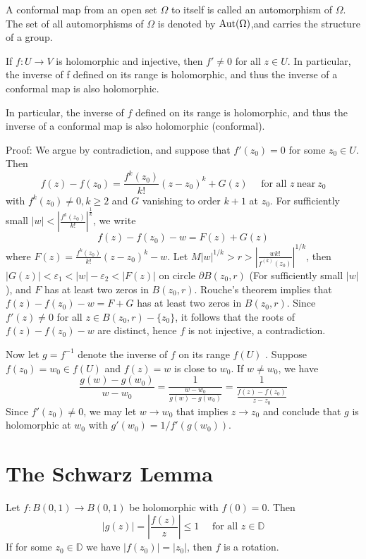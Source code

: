 \documentclass[12pt, oneside]{book}
\begin{document}
\begin{definition}
    A conformal map from an open set $\Omega$ to itself is called an automorphism of $\Omega$.
    The set of all automorphisms of $\Omega$ is denoted by $\operatorname{\operatorname{Aut}}(\Omega)$,and carries the structure of a group.
\end{definition}
\begin{theorem}
    If $f:U\longrightarrow V$ is holomorphic and injective, then $f'\neq0$ for all $z\in U$. In particular, the inverse of f defined on its range is holomorphic, and thus the inverse of a conformal map is also holomorphic.

    In particular, the inverse of $f$ deﬁned on its range is holomorphic, and thus the inverse of a conformal map is also holomorphic (conformal).

    Proof: We argue by contradiction, and suppose that $f'(z_0)= 0$ for some $z_0\in U$. Then
    $$f(z)-f(z_0)=\frac{f^{k}(z_0)}{k!}(z-z_0)^k+G(z)\quad\text{ for all }z\mathrm{~near~}z_0$$
    with $f^{k}(z_0)\neq 0, k\geq2$ and $G$ vanishing to order $k + 1$ at $z_0$. For suﬃciently small $\left|w\right|<\left|\frac{f^{k}(z_0)}{k!}\right|^{\frac{1}{k}}$, we write
    $$f(z)-f(z_0)- w=F(z)+G(z)$$
    where $F(z)=\frac{f^{k}(z_0)}{k!}(z-z_0)^k-w$. Let $M\left|w\right|^{1/k}>r>\left|\frac{wk!}{f^{(k)}(z_0)}\right|^{1/k}$, then $\left|G(z)\right|<\varepsilon_1<\left|w\right| -\varepsilon_2<\left|F(z)\right|$ on circle $\partial B(z_0,r)$ (For suﬃciently small $\left|w\right|$), and $F$ has at least two zeros in $B(z_0,r)$.  Rouche's theorem implies that $f(z)-f(z_0)-w=F+G$ has at least two zeros in $B(z_0,r)$. Since $f'(z)\neq 0$ for all $z \in B(z_0,r)-\{z_0\}$, it follows that the roots of $f(z)-f(z_0)- w$ are distinct, hence $f$ is not injective, a contradiction.

    Now let $g = f^{-1}$ denote the inverse of $f$ on its range $f(U)$ . Suppose $f(z_0)=w_0\in f(U)$ and $f(z)=w$ is close to $w_0$. If $w\neq w_0$, we have
    $$\frac{g(w)-g(w_0)}{w-w_0}=\frac{1}{\frac{w-w_0}{g(w)-g(w_0)}}=\frac{1}{\frac{f(z)-f(z_0)}{z-z_0}}$$
    Since $f'(z_0)\neq 0$, we may let $w\to w_0$ that implies $z\to z_0$ and conclude that $g$ is holomorphic at $w_0$ with $g'(w_0)=1/f'(g(w_0))$.
\end{theorem}

\section{The Schwarz Lemma}
\begin{theorem}
    Let $f:B(0,1)\longrightarrow B(0,1)$ be holomorphic with $f(0) = 0$. Then
    $$\left|g(z)\right|=\left|\frac{f(z)}{z}\right|\leq 1\quad \text{ for all } z\in \mathbb{D}$$
    If for some $z_0\in\mathbb{D}$ we have $\left|f(z_0)\right| = \left|z_0\right|$, then $f$ is a rotation.
\end{theorem}
\end{document}
